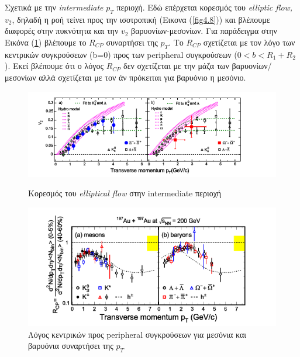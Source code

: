 	
%	

	Σχετικά με την  \textit{intermediate} $p_T$ περιοχή.
Εδώ επέρχεται κορεσμός του \textit{elliptic flow, $v_2$}, δηλαδή η ροή τείνει προς την ισοτροπική (Εικονα (\ref{fig4.8})) και βλέπουμε διαφορές στην πυκνότητα και την $v_2$ βαρυονίων-μεσονίων. 
	Για παράδειγμα στην Εικόνα (\ref{fig4.9}) βλέπουμε το $R_{CP}$ συναρτήσει της $p_T$. Το $R_{CP}$ σχετίζεται με τον λόγο των κεντρικών συγκρούσεων (b=0) προς των peripheral συγκρούσεων ($0<b<R_1+R_2$). Εκεί βλέπουμε ότι ο λόγος $R_{CP}$ δεν σχετίζεται με την μάζα των βαρυονίων/μεσονίων αλλά σχετίζεται με τον άν πρόκειται για βαρυόνιο η μεσόνιο. 
	

		
		\begin{figure}[h!]
		    \centering
		    \begin{minipage}{.5\textwidth}
		        \centering
		        \includegraphics[width=1.1\linewidth, height=0.2\textheight]{STAR_Results/results_intermediate}
		        \caption{Κορεσμός του \textit{elliptical flow} στην intermediate περιοχή}
		        \label{fig4.8}
		    \end{minipage}%
		    \begin{minipage}{0.5\textwidth}
		        \centering
		        \includegraphics[width=1.1\linewidth, height=0.2\textheight]{STAR_Results/results_intermediate2}
		        \caption{Λόγος κεντρικών προς peripheral συγκρούσεων για μεσόνια και βαρυόνια συναρτήσει της $p_T$}
		        \label{fig4.9}
		    \end{minipage}
		\end{figure}   
	
